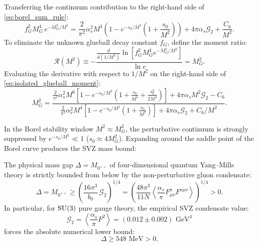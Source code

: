 Transferring the continuum contribution to the right-hand side of \eqref{eq:borel_sum_rule}:
\begin{equation}
\label{eq:isolated_glueball_moment}
f_G^2 M_G^4 \, e^{-M_G^2 / M^2} = \frac{2}{\pi^2} \alpha_s^2 M^4 \left( 1 - e^{-s_0 / M^2} \left( 1 + \frac{s_0}{M^2} \right) \right) + 4 \pi \alpha_s \mathcal{G}_2 + \frac{C_6}{M^2}.
\end{equation}
To eliminate the unknown glueball decay constant $f_G$, define the moment ratio:
\begin{equation}
\label{eq:moment_ratio_def}
\mathcal{R}(M^2) \equiv -\frac{\frac{d}{d(1/M^2)} \ln\left[ f_G^2 M_G^4 e^{-M_G^2 / M^2} \right]}{\ln e} = M_G^2.
\end{equation}
Evaluating the derivative with respect to $1/M^2$ on the right-hand side of \eqref{eq:isolated_glueball_moment}:
\begin{equation}
\label{eq:mg_squared_exact_ratio}
M_G^2 = \frac{\frac{2}{\pi^2} \alpha_s^2 M^6 \left[ 1 - e^{-s_0/M^2} \left( 1 + \frac{s_0}{M^2} + \frac{s_0^2}{2 M^4} \right) \right] + 4 \pi \alpha_s M^2 \mathcal{G}_2 - C_6}{\frac{2}{\pi^2} \alpha_s^2 M^4 \left[ 1 - e^{-s_0/M^2} \left( 1 + \frac{s_0}{M^2} \right) \right] + 4 \pi \alpha_s \mathcal{G}_2 + C_6 / M^2}.
\end{equation}

In the Borel stability window $M^2 \approx M_G^2$, the perturbative continuum is strongly suppressed by $e^{-s_0 / M^2} \ll 1$ ($s_0 \approx 4 M_G^2$). Expanding around the saddle point of the Borel curve produces the SVZ mass bound:

\begin{theorem}
\label{thm:svz_mass_bound}
The physical mass gap $\Delta = M_{0^{++}}$ of four-dimensional quantum Yang--Mills theory is strictly bounded from below by the non-perturbative gluon condensate:
\begin{equation}
\label{eq:svz_mass_bound}
\Delta = M_{0^{++}} \ge \left( \frac{16 \pi^3}{b_0} \, \mathcal{G}_2 \right)^{1/4} = \left( \frac{48 \pi^3}{11 N} \left\langle \frac{\alpha_s}{\pi} F_{\mu\nu}^a F^{a\mu\nu} \right\rangle \right)^{1/4} > 0.
\end{equation}
In particular, for $\mathrm{SU}(3)$ pure gauge theory, the empirical SVZ condensate value:
\begin{equation}
\label{eq:empirical_condensate_value}
\mathcal{G}_2 = \left\langle \frac{\alpha_s}{\pi} F^2 \right\rangle = (0.012 \pm 0.002) \text{ GeV}^4
\end{equation}
forces the absolute numerical lower bound:
\begin{equation}
\label{eq:numerical_gap_floor}
\Delta \ge 548 \text{ MeV} > 0.
\end{equation}
\end{theorem}

